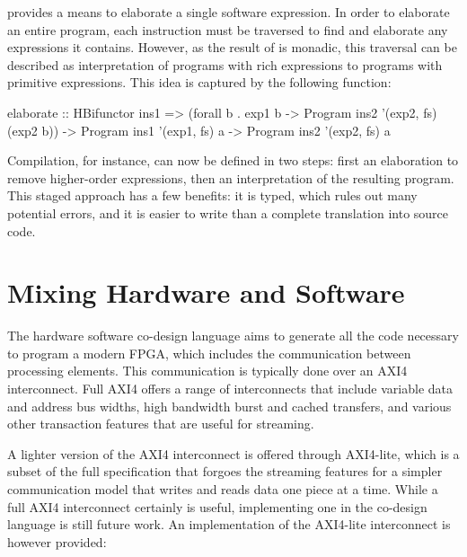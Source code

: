\documentclass[../paper.tex]{subfiles}
\begin{document}
 provides a means to elaborate a single software expression. In order to elaborate an entire program, each instruction must be traversed to find and elaborate any expressions it contains. However, as the result of  is monadic, this traversal can be described as interpretation of programs with rich expressions to programs with primitive expressions. This idea is captured by the following function:

\begin{code}
elaborate :: HBifunctor ins1
    => (forall b . exp1 b -> Program ins2 '(exp2, fs) (exp2 b))
    -> Program ins1 '(exp1, fs) a -> Program ins2 '(exp2, fs) a
\end{code}

\noindent Compilation, for instance, can now be defined in two steps: first an elaboration to remove higher-order expressions, then an interpretation of the resulting program. This staged approach has a few benefits: it is typed, which rules out many potential errors, and it is easier to write than a complete translation into source code.

\section{Mixing Hardware and Software}
\label{comp}

The hardware software co-design language aims to generate all the code necessary to program a modern FPGA, which includes the communication between processing elements. This communication is typically done over an AXI4 interconnect. Full AXI4 offers a range of interconnects that include variable data and address bus widths, high bandwidth burst and cached transfers, and various other transaction features that are useful for streaming.

A lighter version of the AXI4 interconnect is offered through AXI4-lite, which is a subset of the full specification that forgoes the streaming features for a simpler communication model that writes and reads data one piece at a time. While a full AXI4 interconnect certainly is useful, implementing one in the co-design language is still future work. An implementation of the AXI4-lite interconnect is however provided:
\end{document}
